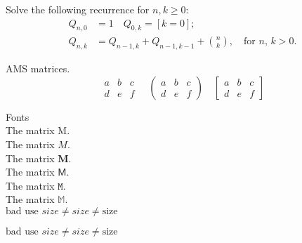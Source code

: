 \documentclass{article}
\begin{document}
Solve the following recurrence for 
$ n,k\geq 0 $:
\begin{align*}
	Q_{n,0} &= 1	\quad Q_{0,k} = [k=0]; \\
	Q_{n,k} &= Q_{n-1,k}+Q_{n-1,k-1}+\binom{n}{k}, \quad\text{for $n$, $k>0$.}
\end{align*}


AMS matrices.
\[
\begin{matrix}
a & b & c \\
d & e & f
\end{matrix}
\quad
\begin{pmatrix}
a & b & c \\
d & e & f
\end{pmatrix} %
\quad
\begin{bmatrix} %
a & b & c \\
d & e & f
\end{bmatrix}
\]


Fonts\\
The matrix $\mathrm{M}$. \\
The matrix $\mathit{M}$. \\
The matrix $\mathbf{M}$. \\
The matrix $\mathsf{M}$. \\
The matrix $\mathtt{M}$. \\
The matrix $\mathbb{M}$. \\

$\text{bad use } size  \neq \mathit{size} \neq \mathrm{size} $

\textit{$\text{bad use } size \neq \mathit{size} \neq \mathrm{size} $}
\end{document}

